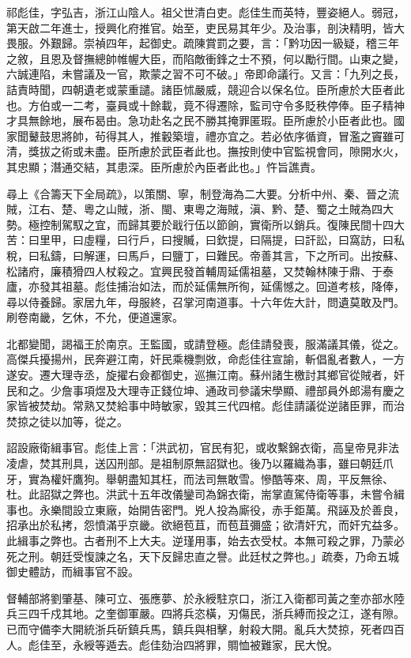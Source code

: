 \begin{pinyinscope}
祁彪佳，字弘吉，浙江山陰人。祖父世清白吏。彪佳生而英特，豐姿絕人。弱冠，第天啟二年進士，授興化府推官。始至，吏民易其年少。及治事，剖決精明，皆大畏服。外艱歸。崇禎四年，起御史。疏陳賞罰之要，言：「黔功因一級疑，稽三年之敘，且恩及督撫總帥帷幄大臣，而陷敵衝鋒之士不預，何以勵行間。山東之變，六誠連陷，未嘗議及一官，欺蒙之習不可不破。」帝即命議行。又言：「九列之長，詰責時聞，四朝遺老或蒙重譴。諸臣怵嚴威，競迎合以保名位。臣所慮於大臣者此也。方伯或一二考，臺員或十餘載，竟不得遷除，監司守令多貶秩停俸。臣子精神才具無餘地，展布曷由。急功赴名之民不勝其掩罪匿瑕。臣所慮於小臣者此也。國家聞鼙鼓思將帥，茍得其人，推轂築壇，禮亦宜之。若必依序循資，冒濫之竇雖可清，獎拔之術或未盡。臣所慮於武臣者此也。撫按則使中官監視會同，隙開水火，其忠顯；潛通交結，其患深。臣所慮於內臣者此也。」忤旨譙責。

尋上《合籌天下全局疏》，以策關、寧，制登海為二大要。分析中州、秦、晉之流賊，江右、楚、粵之山賊，浙、閩、東粵之海賊，滇、黔、楚、蜀之土賊為四大勢。極控制駕馭之宜，而歸其要於戢行伍以節餉，實衛所以銷兵。復陳民間十四大苦：曰里甲，曰虛糧，曰行戶，曰搜贓，曰欽提，曰隔提，曰訐訟，曰窩訪，曰私稅，曰私鑄，曰解運，曰馬戶，曰鹽丁，曰難民。帝善其言，下之所司。出按蘇、松諸府，廉積猾四人杖殺之。宜興民發首輔周延儒祖墓，又焚翰林陳于鼎、于泰廬，亦發其祖墓。彪佳捕治如法，而於延儒無所徇，延儒憾之。回道考核，降俸，尋以侍養歸。家居九年，母服終，召掌河南道事。十六年佐大計，問遺莫敢及門。刷卷南畿，乞休，不允，便道還家。

北都變聞，謁福王於南京。王監國，或請登極。彪佳請發喪，服滿議其儀，從之。高傑兵擾揚州，民奔避江南，奸民乘機剽敚，命彪佳往宣諭，斬倡亂者數人，一方遂安。遷大理寺丞，旋擢右僉都御史，巡撫江南。蘇州諸生檄討其鄉官從賊者，奸民和之。少詹事項煜及大理寺正錢位坤、通政司參議宋學顯、禮部員外郎湯有慶之家皆被焚劫。常熟又焚給事中時敏家，毀其三代四棺。彪佳請議從逆諸臣罪，而治焚掠之徒以加等，從之。

詔設廠衛緝事官。彪佳上言：「洪武初，官民有犯，或收繫錦衣衛，高皇帝見非法凌虐，焚其刑具，送囚刑部。是祖制原無詔獄也。後乃以羅織為事，雖曰朝廷爪牙，實為權奸鷹狗。舉朝盡知其枉，而法司無敢雪。慘酷等來、周，平反無徐、杜。此詔獄之弊也。洪武十五年改儀鑾司為錦衣衛，耑掌直駕侍衛等事，未嘗令緝事也。永樂間設立東廠，始開告密門。兇人投為廝役，赤手鉅萬。飛誣及於善良，招承出於私拷，怨憤滿乎京畿。欲絕苞苴，而苞苴彌盛；欲清奸宄，而奸宄益多。此緝事之弊也。古者刑不上大夫。逆瑾用事，始去衣受杖。本無可殺之罪，乃蒙必死之刑。朝廷受愎諫之名，天下反歸忠直之譽。此廷杖之弊也。」疏奏，乃命五城御史體訪，而緝事官不設。

督輔部將劉肇基、陳可立、張應夢、於永綬駐京口，浙江入衛都司黃之奎亦部水陸兵三四千戍其地。之奎御軍嚴。四將兵恣橫，刃傷民，浙兵縛而投之江，遂有隙。已而守備李大開統浙兵斫鎮兵馬，鎮兵與相擊，射殺大開。亂兵大焚掠，死者四百人。彪佳至，永綬等遁去。彪佳劾治四將罪，賙恤被難家，民大悅。


\end{pinyinscope}

